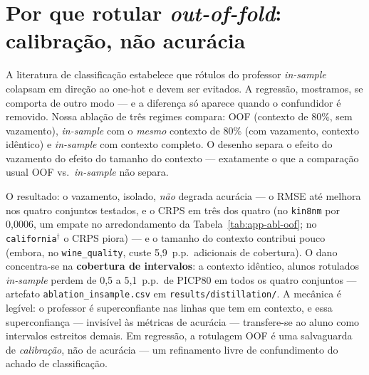 \section{Por que rotular \emph{out-of-fold}: calibração, não acurácia}
\label{sec:destil-oof}

A literatura de classificação \citep{pocketfm2026} estabelece que
rótulos do professor \emph{in-sample} colapsam em direção ao one-hot e
devem ser evitados. A regressão, mostramos, se comporta de outro modo
--- e a diferença só aparece quando o confundidor é removido. Nossa
ablação de três regimes compara: OOF (contexto de 80\%, sem
vazamento), \emph{in-sample} com o \emph{mesmo} contexto de 80\% (com
vazamento, contexto idêntico) e \emph{in-sample} com contexto
completo. O desenho separa o efeito do vazamento do efeito do tamanho do contexto ---
exatamente o que a comparação usual OOF vs.\ \emph{in-sample} não
separa.

O resultado: o vazamento, isolado, \emph{não} degrada acurácia --- o
RMSE até melhora nos quatro conjuntos testados, e o CRPS em três dos
quatro (no \texttt{kin8nm} por 0,0006, um empate no arredondamento
da Tabela~\ref{tab:app-abl-oof}; no \texttt{california}$^\dagger$ o
CRPS piora) ---
e o tamanho do contexto contribui pouco (embora, no
\texttt{wine\_quality}, custe 5,9~p.p.\ adicionais de cobertura). O
dano concentra-se na \textbf{cobertura de intervalos}: a contexto
idêntico, alunos rotulados \emph{in-sample} perdem de 0,5 a 5,1~p.p.\
de PICP80 em todos os quatro conjuntos --- artefato
\texttt{ablation\_\allowbreak insample.\allowbreak csv} em \texttt{results/\allowbreak distillation/}. A
mecânica é
legível: o professor é superconfiante nas linhas que tem em contexto, e
essa superconfiança --- invisível às métricas de acurácia ---
transfere-se ao aluno como intervalos estreitos demais. Em regressão,
a rotulagem OOF é uma salvaguarda de \emph{calibração}, não de
acurácia --- um refinamento livre de confundimento do achado de classificação.

